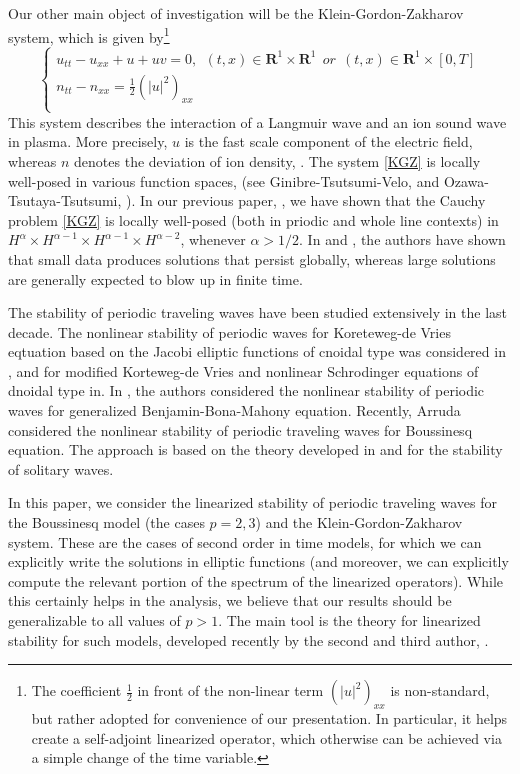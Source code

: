 \documentclass[final,11pt,leqno]{amsart}
\begin{document}
 Our other main object of investigation  will be the Klein-Gordon-Zakharov system, which is given  by\footnote{The coefficient ${\frac{{1}}{{2}}}$ in front
 of the non-linear term $(|u|^2)_{xx}$ is non-standard, but rather adopted for convenience of our presentation. In particular, it helps create a
 self-adjoint linearized operator, which otherwise can be achieved via a simple change of the time variable.}
  \begin{equation}
  \label{KGZ}
    \left\{ \begin{array}{ll}
      u_{tt}-u_{xx}+u+uv=0, \ \  (t,x)\in {\mathbf R^1}\times {\mathbf R^1} \ \ \textit{or}\ \ (t,x)\in {\mathbf R^1}\times [0,T]\\
       n_{tt}- n_{xx}={\frac{{1}}{{2}}}(|u|^2)_{xx} \\
    \end{array} \right.
   \end{equation}
This system    describes the interaction of a
Langmuir wave and an ion sound wave in  plasma. More precisely,
$u$ is the  fast scale component of the electric field, whereas
$n$ denotes the deviation of ion density, \cite{Zakh, Dendy}. The system \eqref{KGZ} is locally well-posed in various function  spaces,
(see  Ginibre-Tsutsumi-Velo, \cite{GTV} and
Ozawa-Tsutaya-Tsutsumi, \cite{OTT}).  In our previous paper, \cite{HSS}, we have shown that the Cauchy problem \eqref{KGZ} is locally well-posed
(both in priodic and whole line contexts) in $H^{\alpha} \times H^{{\alpha}-1}\times H^{{\alpha}-1}\times H^{{\alpha}-2}$, whenever ${\alpha}>1/2$.  In  \cite{OTT} and  \cite{OTT1},
the authors have shown that small data produces solutions that persist globally, whereas large solutions are generally expected to blow up in finite time.

The stability of periodic traveling waves have been studied
extensively in the last decade. The nonlinear stability of
periodic waves for Koreteweg-de Vries eqtuation  based on the
Jacobi elliptic functions of cnoidal type   was considered in
\cite{ABS}, and for modified Korteweg-de Vries and nonlinear
Schrodinger equations of dnoidal type in\cite{An2}. In \cite{HIK}, the authors 
  considered the nonlinear stability of periodic waves for
generalized Benjamin-Bona-Mahony equation. Recently,  Arruda
\cite{Ar} considered the nonlinear stability of periodic traveling
waves for Boussinesq equation. The approach is based on the theory
developed in \cite{Be1, Bo} and \cite{GSS} for the stability of
solitary waves.

In this paper, we consider the linearized stability of periodic traveling  waves for the Boussinesq model (the cases $p=2,3$) and the Klein-Gordon-Zakharov system. These are the cases of second order in time models, for which we can explicitly write the solutions in elliptic functions (and moreover, we can explicitly compute the relevant portion of the  spectrum of the   linearized operators). While this certainly helps in the analysis,   we believe that our results should be generalizable to all values of $p>1$. 
The main tool is the theory for linearized stability for such models, developed recently by the second and third author, \cite{SS1}. 
\end{document}
